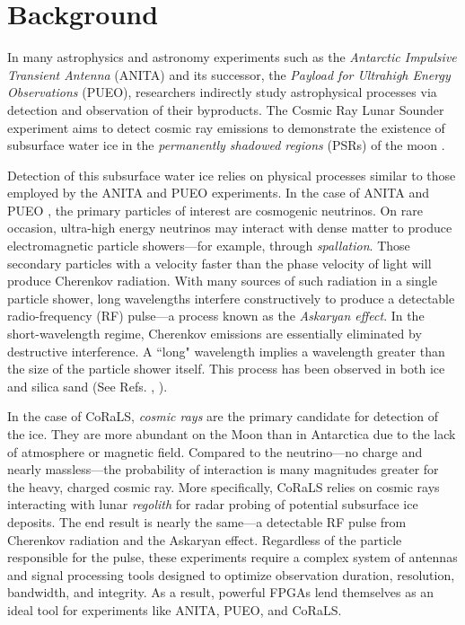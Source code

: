 \documentclass[reprint,amsmath,amssymb,aps,pra]{revtex4-2}
\begin{document}
\section{Background}

In many astrophysics and astronomy experiments such as the \textit{Antarctic Impulsive Transient Antenna} (ANITA) and its successor, the \textit{Payload for Ultrahigh Energy Observations} (PUEO), researchers indirectly study astrophysical processes via detection and observation of their byproducts. The Cosmic Ray Lunar Sounder experiment aims to detect cosmic ray emissions to demonstrate the existence of subsurface water ice in the \textit{permanently shadowed regions} (PSRs) of the moon \cite{CoRaLS-whitepaper}. 

Detection of this subsurface water ice relies on physical processes similar to those employed by the ANITA and PUEO experiments. In the case of ANITA and PUEO \cite{PUEO-whitepaper}, the primary particles of interest are cosmogenic neutrinos. On rare occasion, ultra-high energy neutrinos may interact with dense matter to produce electromagnetic particle showers---for example, through \textit{spallation}. Those secondary particles with a velocity faster than the phase velocity of light will produce Cherenkov radiation. With many sources of such radiation in a single particle shower, long wavelengths interfere constructively to produce a detectable radio-frequency (RF) pulse---a process known as the \textit{Askaryan effect}. In the short-wavelength regime, Cherenkov emissions are essentially eliminated by destructive interference. A ``long" wavelength implies a wavelength greater than the size of the particle shower itself. This process has been observed in both ice and silica sand (See Refs. \cite{Askaryan-Effect-Ice}, \cite{Askaryan-Effect-Sand}).

In the case of CoRaLS, \textit{cosmic rays} are the primary candidate for detection of the ice. They are more abundant on the Moon than in Antarctica due to the lack of atmosphere or magnetic field. Compared to the neutrino---no charge and nearly massless---the probability of interaction is many magnitudes greater for the heavy, charged cosmic ray. More specifically, CoRaLS relies on cosmic rays interacting with lunar \textit{regolith} for radar probing of potential subsurface ice deposits. The end result is nearly the same---a detectable RF pulse from Cherenkov radiation and the Askaryan effect. Regardless of the particle responsible for the pulse, these experiments require a complex system of antennas and signal processing tools designed to optimize observation duration, resolution, bandwidth, and integrity. As a result, powerful FPGAs lend themselves as an ideal tool for experiments like ANITA, PUEO, and CoRaLS.
\end{document}
